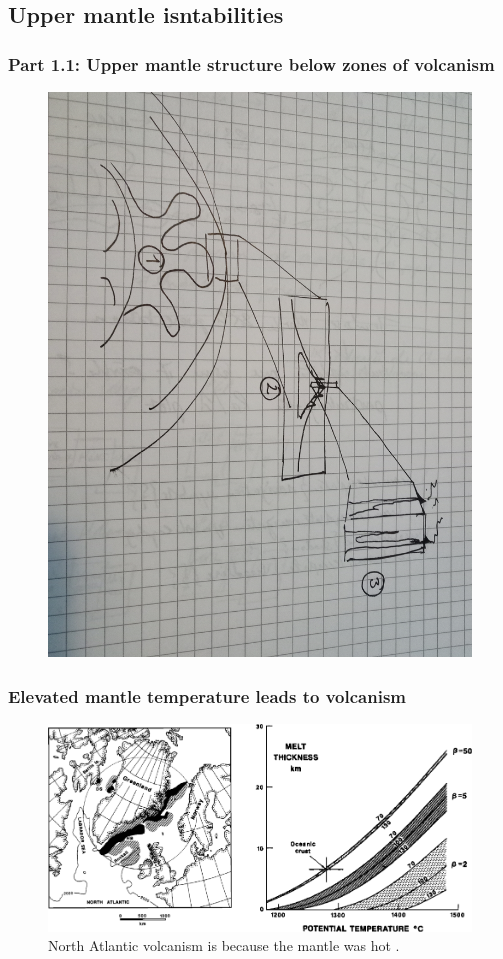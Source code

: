 \documentclass[aspectratio=169]{beamer}
\begin{document}
\subsection{Upper mantle isntabilities}

\begin{frame}
    \frametitle{Part 1.1: Upper mantle structure below zones of volcanism}
    \begin{figure}
        \includegraphics[height=0.8\paperheight, angle=90]{./pictures/temporary-drawing-2.jpg}
    \end{figure}
\end{frame}

\begin{frame}
    \frametitle{Elevated mantle temperature leads to volcanism}
    \begin{figure}
        \includegraphics[height=0.6\paperheight]{./figures/mckenzie.png}
        \caption{North Atlantic volcanism is because the mantle was hot \citep{white-1995}.}
    \end{figure}
\end{frame}
\end{document}
